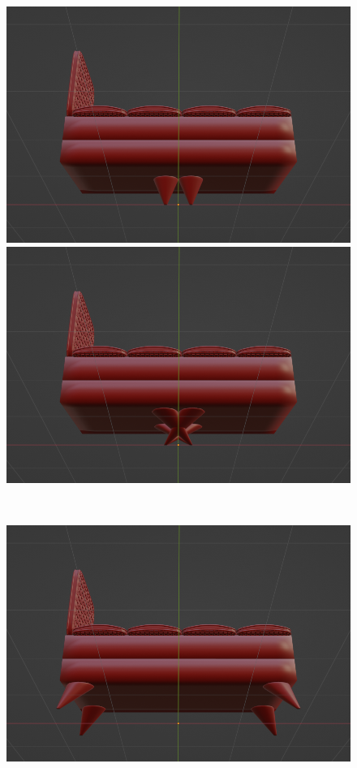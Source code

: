 \begin{figure}[h]
 \begin{minipage}[b]{0.48\linewidth}
  \centering
  \includegraphics[scale=0.17]{./imgs/sofaParamMean/legAngleMin.png}
 \end{minipage}
 \begin{minipage}[b]{0.48\linewidth}
  \centering
  \includegraphics[scale=0.17]{./imgs/sofaParamMean/legAngleMax.png}
 \end{minipage}\\
  \begin{minipage}[b]{0.48\linewidth}
  \centering
  \includegraphics[scale=0.17]{./imgs/sofaParamMean/legPosMin.png}

\end{minipage}
\end{figure}
